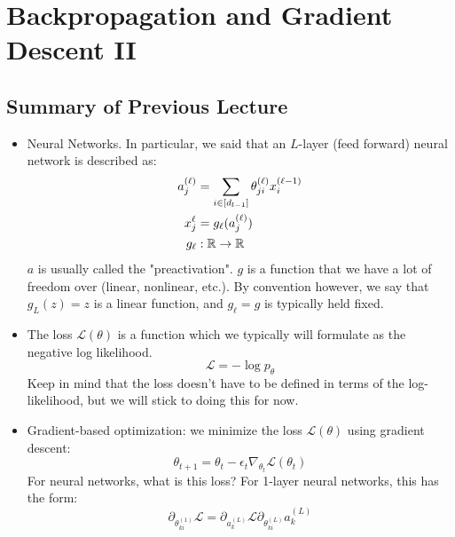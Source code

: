\section{Backpropagation and Gradient Descent II}
\subsection{Summary of Previous Lecture}
\begin{itemize}
	\item Neural Networks. In particular, we said that
		an \( L \)-layer (feed forward) neural network is described as:
		\begin{align*}
			a_j^{(\ell)} &= \sum_{i \in [d_{l - 1}]} \theta_{ji}^{(\ell)} x_i^{(\ell -
				1)}\\ 
					x_{j}^{\ell} &= g_\ell(a_j^{(\ell)})\\
			g_\ell &: \mathbb R \to \mathbb R
		\end{align*}
		\( a \) is usually called the "preactivation". \( g \) is a function that we
		have a lot of freedom over (linear, nonlinear, etc.). By convention however,
		we say that \( g_L(z) = z \) is a linear function, and \( g_{\ell} = g \) is
		typically held fixed. 
	\item The loss \( \mathcal{L}(\theta) \) is a function which we typically will
		formulate as the negative log likelihood. 
		\[
			\mathcal{L} = -\log p_\theta
		\]
		Keep in mind that the loss doesn't have to be defined in terms of the
		log-likelihood, but we will stick to doing this for now.  
	\item Gradient-based optimization: we minimize the loss \( \mathcal{L}(\theta) \)
		using gradient descent:
		\[
			\theta_{t + 1} = \theta_t - \epsilon_t \nabla_{\theta_t}
			\mathcal{L}(\theta_t)
		\]
		For neural networks, what is this loss? For 1-layer neural networks, this has 
		the form:
		\[
			\partial_{\theta_{ki}^{(1)}}\mathcal{L} = \partial_{a_k^{(L)}}\mathcal{L}
			\partial_{\theta_{ki}^{(L)}}a_k^{(L)}
		\]

\end{itemize}
